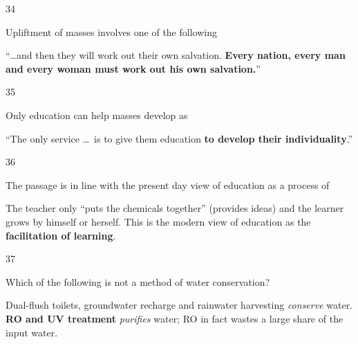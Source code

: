 \begin{question}{34}
{Upliftment of masses involves one of the following\par}
\begin{explain}
``\ldots and then they will work out their own salvation. \textbf{Every nation, every man and every woman must work out his own salvation.}''
\end{explain}
\end{question}

\begin{question}{35}
{Only education can help masses develop as\par}
\begin{explain}
``The only service \ldots\ is to give them education \textbf{to develop their individuality}.''
\end{explain}
\end{question}

\begin{question}{36}
{The passage is in line with the present day view of education as a process of\par}
\begin{explain}
The teacher only ``puts the chemicals together'' (provides ideas) and the learner grows by himself or herself. This is the modern view of education as the \textbf{facilitation of learning}.
\end{explain}
\end{question}

\begin{question}{37}
{Which of the following is not a method of water conservation?\par}
\begin{explain}
Dual-flush toilets, groundwater recharge and rainwater harvesting \emph{conserve} water. \textbf{RO and UV treatment} \emph{purifies} water; RO in fact wastes a large share of the input water.
\end{explain}
\end{question}


